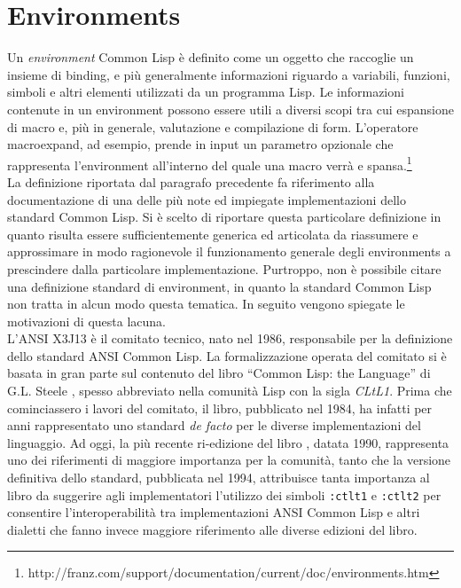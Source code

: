 \section{Environments}

Un \textit{environment} Common Lisp è definito come un oggetto che raccoglie
un insieme di binding, e più generalmente informazioni riguardo a variabili,
funzioni, simboli e altri elementi utilizzati da un programma Lisp. Le
informazioni contenute in un environment possono essere utili a diversi scopi
tra cui espansione di macro e, più in generale, valutazione e compilazione di
form. L’operatore macroexpand, ad esempio, prende in input un parametro
opzionale che rappresenta l’environment all’interno del quale una macro verrà
e spansa.\footnote{http://franz.com/support/documentation/current/doc/environments.htm}\\

La definizione riportata dal paragrafo precedente fa riferimento alla
documentazione di una delle più note ed impiegate implementazioni dello
standard Common Lisp. Si è scelto di riportare questa particolare definizione
in quanto risulta essere sufficientemente generica ed articolata da riassumere
e approssimare in modo ragionevole il funzionamento generale degli
environments a prescindere dalla particolare implementazione. Purtroppo, non è
possibile citare una definizione standard di environment, in quanto la
standard Common Lisp non tratta in alcun modo questa tematica. In seguito
vengono spiegate le motivazioni di questa lacuna.\\

L’ANSI X3J13 è il comitato tecnico, nato nel 1986, responsabile per la
definizione dello standard ANSI Common Lisp. La formalizzazione operata del
comitato si è basata in gran parte sul contenuto del libro “Common Lisp: the
Language” di G.L. Steele \cite{steele1984common}, spesso abbreviato nella
comunità Lisp con la sigla \textit{CLtL1}. Prima che cominciassero i lavori
del comitato, il libro, pubblicato nel 1984, ha infatti per anni rappresentato
uno standard \textit{de facto} per le diverse implementazioni del linguaggio.
Ad oggi, la più recente ri-edizione del libro \cite{steele1990common}, datata
1990, rappresenta uno dei riferimenti di maggiore importanza per la comunità,
tanto che la versione definitiva dello standard, pubblicata nel 1994,
attribuisce tanta importanza al libro da suggerire agli implementatori
l’utilizzo dei simboli \texttt{:ctlt1} e \texttt{:ctlt2} per consentire
l’interoperabilità tra implementazioni ANSI Common Lisp e altri dialetti che
fanno invece maggiore riferimento alle diverse edizioni del libro.

